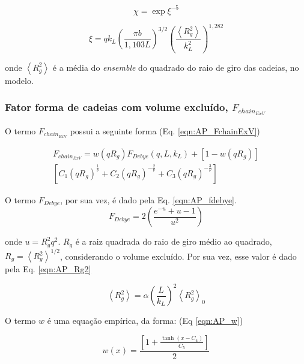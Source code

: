 \begin{apendicesenv}
\begin{equation}
\chi = \exp{\xi^{-5}}
\label{eqn:AP_chi}
\end{equation}

\begin{equation}
\xi = q k_L\left(\frac{\pi b}{1,103L}\right)^{3/2}\left(\frac{\left<R_g^2\right>}{k_L^2}\right)^{1,282}
\label{eqn:AP_xi}
\end{equation}

\noindent onde $\left<R_g^2\right>$ é a média do \emph{ensemble} do quadrado do raio de giro das cadeias, no modelo.

\subsubsection{Fator forma de cadeias com volume excluído, $F_{chain_{ExV}}$}
\label{sec:F_chain_ExV_equacoes}
O termo $F_{chain_{ExV}}$ possui a seguinte forma (Eq. \ref{eqn:AP_FchainExV})

\begin{multline}
F_{chain_{ExV}} = w(qR_g)F_{Debye}(q,L,k_L) + \left[1 - w(q R_g)\right] \\ \left[C_1(q R_g)^{\frac{1}{\nu}} + C_2(q R_g)^{-\frac{2}{\nu}} + 
C_3(q R_g)^{-\frac{3}{\nu}}\right]
\label{eqn:AP_FchainExV}
\end{multline}

O termo $F_{Debye}$, por sua vez, é dado pela Eq. \ref{eqn:AP_fdebye}.
\begin{equation}
F_{Debye} = 2 \left(\frac{e^{-u} + u - 1}{u^2}\right)
\label{eqn:AP_fdebye}
\end{equation}

\noindent onde $u = R_g^2q^2$. $R_g$ é a raiz quadrada do raio de giro médio ao quadrado, $R_g = \left<R_g^2\right>^{1/2}$, considerando o volume excluído. Por sua vez, esse valor é dado pela Eq. \ref{eqn:AP_Rg2}

\begin{equation}
\left<R_g^2\right> = \alpha \left(\frac{L}{k_L}\right)^2\left<R_g^2\right>_0
\label{eqn:AP_Rg2}
\end{equation}

O termo $w$ é uma equação empírica, da forma: (Eq \ref{eqn:AP_w})

\begin{equation}
w(x) = \frac{\left[1 + \frac{\tanh(x-C_4)}{C_5}\right]}{2}
\label{eqn:AP_w}
\end{equation}


\end{apendicesenv}

